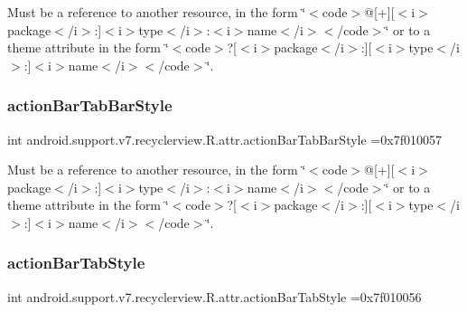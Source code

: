 Must be a reference to another resource, in the form \char`\"{}$<$code$>$@\mbox{[}+\mbox{]}\mbox{[}$<$i$>$package$<$/i$>$\+:\mbox{]}$<$i$>$type$<$/i$>$\+:$<$i$>$name$<$/i$>$$<$/code$>$\char`\"{} or to a theme attribute in the form \char`\"{}$<$code$>$?\mbox{[}$<$i$>$package$<$/i$>$\+:\mbox{]}\mbox{[}$<$i$>$type$<$/i$>$\+:\mbox{]}$<$i$>$name$<$/i$>$$<$/code$>$\char`\"{}. \mbox{\label{classandroid_1_1support_1_1v7_1_1recyclerview_1_1R_1_1attr_a19c7f25731e63cd379980120784bea76}} 
\subsubsection{\texorpdfstring{action\+Bar\+Tab\+Bar\+Style}{actionBarTabBarStyle}}
{\footnotesize\ttfamily int android.\+support.\+v7.\+recyclerview.\+R.\+attr.\+action\+Bar\+Tab\+Bar\+Style =0x7f010057\hspace{0.3cm}{\ttfamily [static]}}

Must be a reference to another resource, in the form \char`\"{}$<$code$>$@\mbox{[}+\mbox{]}\mbox{[}$<$i$>$package$<$/i$>$\+:\mbox{]}$<$i$>$type$<$/i$>$\+:$<$i$>$name$<$/i$>$$<$/code$>$\char`\"{} or to a theme attribute in the form \char`\"{}$<$code$>$?\mbox{[}$<$i$>$package$<$/i$>$\+:\mbox{]}\mbox{[}$<$i$>$type$<$/i$>$\+:\mbox{]}$<$i$>$name$<$/i$>$$<$/code$>$\char`\"{}. \mbox{\label{classandroid_1_1support_1_1v7_1_1recyclerview_1_1R_1_1attr_a564d086d22e53a75d6ce3758856bc892}} 
\subsubsection{\texorpdfstring{action\+Bar\+Tab\+Style}{actionBarTabStyle}}
{\footnotesize\ttfamily int android.\+support.\+v7.\+recyclerview.\+R.\+attr.\+action\+Bar\+Tab\+Style =0x7f010056\hspace{0.3cm}{\ttfamily [static]}}

